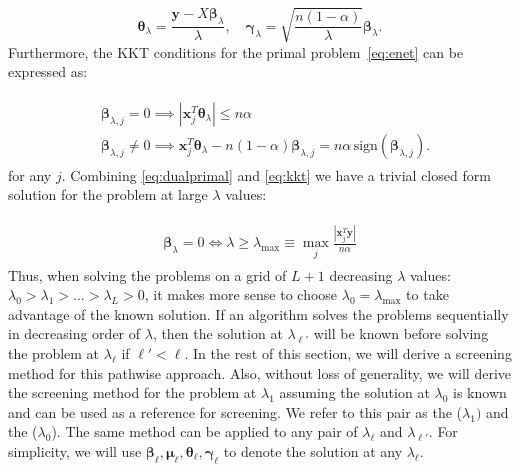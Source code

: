 \begin{equation}
    \label{eq:dualprimal}
    \boldsymbol\theta_\lambda=\frac{\boldsymbol y-X\boldsymbol\beta_\lambda}{\lambda},\quad \boldsymbol\gamma_\lambda=\sqrt{\frac{n(1-\alpha)}{\lambda}}\boldsymbol\beta_\lambda.
\end{equation}
Furthermore, the KKT conditions for the primal problem~\eqref{eq:enet} can be expressed as:

\begin{gather}
    \label{eq:kkt}
    \begin{aligned}&\boldsymbol\beta_{\lambda,j}=0\implies|\boldsymbol x_j^T\boldsymbol\theta_\lambda|\leq n\alpha\\
    & \boldsymbol\beta_{\lambda,j}\neq0\implies  \boldsymbol x_j^T\boldsymbol\theta_\lambda-n(1-\alpha)\boldsymbol\beta_{\lambda,j}=n\alpha\,\textrm{sign}(\boldsymbol\beta_{\lambda,j}).
    \end{aligned}
\end{gather}
for any $j$. Combining \eqref{eq:dualprimal} and \eqref{eq:kkt} we have a trivial closed form solution for the problem at large $\lambda$ values:

\begin{gather}
    \label{eq:lammax}
    \begin{aligned}
        \boldsymbol\beta_\lambda=0\iff \lambda \geq \lambda_{\max}\equiv \max_j \frac{|\boldsymbol x_j^T\boldsymbol y|}{n\alpha}
    \end{aligned}
\end{gather}
Thus, when solving the problems on a grid of $L+1$ decreasing $\lambda$ values: $\lambda_0>\lambda_1>...>\lambda_L>0$, it makes more sense to choose $\lambda_0=\lambda_{\max}$ to take advantage of the known solution. If an algorithm solves the problems sequentially in decreasing order of $\lambda$, then the solution at $\lambda_{\ell'}$ will be known before solving the problem at $\lambda_\ell$ if $\ell'<\ell$. In the rest of this section, we will derive a screening method for this pathwise approach. Also, without loss of generality, we will derive the screening method for the problem at $\lambda_1$ assuming the solution at $\lambda_0$ is known and can be used as a reference for screening. We refer to this pair as the  ($\lambda_1)$ and the  ($\lambda_0$). The same method can be applied to any pair of $\lambda_{\ell}$ and $\lambda_{\ell'}$. For simplicity, we will use $\boldsymbol\beta_\ell,\boldsymbol\mu_\ell,\boldsymbol\theta_\ell,\boldsymbol\gamma_\ell$ to denote the solution at any $\lambda_\ell$.

